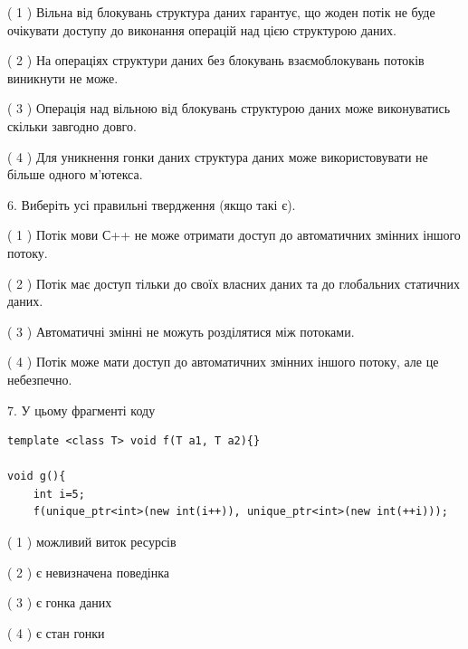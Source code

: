 \documentclass[12pt, ukrainian]{article}
\begin{document}
\begin {large}
{( 1 ) Вільна від блокувань структура даних гарантує, що жоден потік не буде очікувати доступу до виконання операцій над цією структурою даних.%

( 2 ) На операціях структури даних без блокувань взаємоблокувань потоків виникнути не може.%

( 3 ) Операція над вільною від блокувань структурою даних може виконуватись скільки завгодно довго.%

( 4 ) Для уникнення гонки даних структура даних може використовувати не більше одного м’ютекса.%
\newpage



\vspace{5mm}
6. Виберіть усі правильні твердження (якщо такі є).\par
\vspace{2mm}

( 1 ) Потік мови С++ не може отримати доступ до автоматичних змінних іншого потоку.%

( 2 ) Потік має доступ тільки до своїх власних даних та до глобальних статичних даних.%

( 3 ) Автоматичні змінні не можуть розділятися між потоками.%

( 4 ) Потік може мати доступ до автоматичних змінних іншого потоку, але це небезпечно.%


\vspace{5mm}
7. У цьому фрагменті коду
\begin{verbatim}
template <class T> void f(T a1, T a2){}

void g(){
    int i=5;
    f(unique_ptr<int>(new int(i++)), unique_ptr<int>(new int(++i)));
\end{verbatim}

( 1 ) можливий виток ресурсів%

( 2 ) є невизначена поведінка%

( 3 ) є гонка даних%

( 4 ) є стан гонки%
}
\end {large}
\end{document}

